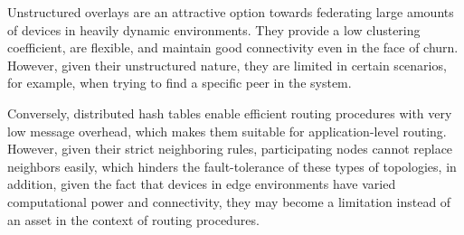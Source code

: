 Unstructured overlays are an attractive option towards federating large amounts of devices in heavily dynamic environments. They provide a low clustering coefficient, are flexible, and maintain good connectivity even in the face of churn. However, given their unstructured nature, they are limited in certain scenarios, for example, when trying to find a specific peer in the system.

Conversely, distributed hash tables enable efficient routing procedures with very low message overhead, which makes them suitable for application-level routing. However, given their strict neighboring rules, participating nodes cannot replace neighbors easily, which hinders the fault-tolerance of these types of topologies, in addition, given the fact that devices in edge environments have varied computational power and connectivity, they may become a limitation instead of an asset in the context of routing procedures. 




